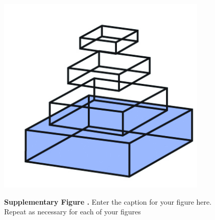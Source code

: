 \documentclass{frontiersSCNSsuppmat} %
\begin{document}

\begin{figure}
\begin{center}
\includegraphics[width=10cm]{logo1}%
\end{center}
\textbf{\label{fig:01} Supplementary Figure .}{ Enter the caption for your figure here.  Repeat as  necessary for each of your figures }
\end{figure}


%
\end{document}

